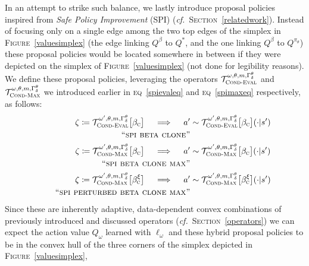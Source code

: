 In an attempt to strike such balance, we lastly introduce proposal policies
inspired from \textit{Safe Policy Improvement} (SPI) \cite{Petrik2016-yc}
(\textit{cf.}~\textsc{Section}~\ref{relatedwork}).
Instead of focusing only on a single edge among the two top edges of the simplex in \textsc{Figure}~\ref{valuesimplex}
(the edge linking $Q^\beta$ to $Q^*$, and the one linking $Q^\beta$ to $Q^{\pi_\theta}$)
these proposal policies would be located somewhere in between if they were depicted on the simplex of
\textsc{Figure}~\ref{valuesimplex} (not done for legibility reasons).
We define these proposal policies, leveraging the operators
$\mathcal{T}_\textsc{Cond-Eval}^{\omega, \theta, m, \Gamma^\theta_\delta}$
and $\mathcal{T}_\textsc{Cond-Max}^{\omega, \theta, m, \Gamma^\theta_\delta}$
we introduced earlier in
\textsc{eq}~\ref{spievaleq} and \textsc{eq}~\ref{spimaxeq}
respectively, as follows:
\begin{align}
  \zeta \coloneqq \mathcal{T}_\textsc{Cond-Eval}^{\omega', \theta, m, \Gamma^\theta_\delta}
  \big[\beta_\textsc{c}\big]
  \quad \implies \quad
  a' &\sim \mathcal{T}_\textsc{Cond-Eval}^{\omega', \theta, m, \Gamma^\theta_\delta}
  \big[\beta_\textsc{c}\big](\cdot | s')
  \\ \tag*{\textsc{``spi beta clone''}}
  \label{spibetaclone} \\
  \zeta \coloneqq \mathcal{T}_\textsc{Cond-Max}^{\omega', \theta, m, \Gamma^\theta_\delta}
  \big[\beta_\textsc{c}\big]
  \quad \implies \quad
  a' &\sim \mathcal{T}_\textsc{Cond-Max}^{\omega', \theta, m, \Gamma^\theta_\delta}
  \big[\beta_\textsc{c}\big](\cdot | s')
  \\ \tag*{\textsc{``spi beta clone max''}}
  \label{spibetaclonemax} \\
  \zeta \coloneqq \mathcal{T}_\textsc{Cond-Max}^{\omega', \theta, m, \Gamma^\theta_\delta}
  \big[\beta_\textsc{c}^\xi\big]
  \quad \implies \quad
  a' &\sim \mathcal{T}_\textsc{Cond-Max}^{\omega', \theta, m, \Gamma^\theta_\delta}
  \big[\beta_\textsc{c}^\xi\big](\cdot | s')
  \\ \tag*{\textsc{``spi perturbed beta clone max''}}
  \label{spiperturbedbetaclonemax}
\end{align}
Since these are inherently adaptive, data-dependent convex combinations of previously introduced and discussed
operators (\textit{cf.}~\textsc{Section}~\ref{operators})
we can expect the action value $Q_\omega$ learned with $\ell_\omega$ and these hybrid proposal policies
to be in the convex hull of the three corners of the simplex depicted in \textsc{Figure}~\ref{valuesimplex},
